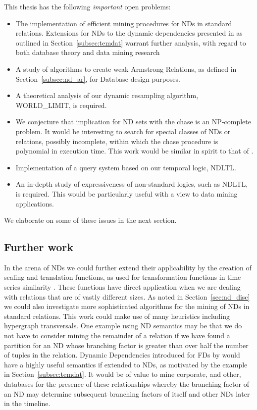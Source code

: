 This thesis has the following {\em important} open problems:
\begin{itemize}
\item The implementation of efficient mining procedures for NDs in
standard relations. Extensions for NDs to the dynamic dependencies presented
in \cite{Via87,Via88} as outlined in Section~\ref{subsec:temdat}
warrant further analysis, with regard to both database theory and data
mining research
\item A study of algorithms to create weak Armstrong Relations, as
defined in Section~\ref{subsec:nd_ar}, for
Database design purposes. 
\item A theoretical analysis of our dynamic resampling
algorithm, WORLD\_LIMIT, is required.
\item We conjecture that
implication for ND sets with the chase is an NP-complete problem. It would be
interesting to search for special classes of NDs or relations,
possibly incomplete, within
which the chase procedure is polynomial in execution time. This work
would be similar in spirit to that of \cite{ll97c}.
\item Implementation of a query system based on our temporal logic,
NDLTL.
\item An in-depth study of expressiveness of non-standard logics, such
as NDLTL, is required. This would be particularly useful with a view to
data mining applications.
\end{itemize}

We elaborate on some of these issues in the next section.

\subsection{Further work}

In the arena of NDs we could further extend their applicability by the
creation of scaling and translation functions, as used for
transformation functions in time series similarity
\cite{alss95}. These functions have direct application when we are
dealing with relations that are of vastly different sizes. As noted in
Section~\ref{sec:nd_disc} we could also investigate more sophisticated
algorithms for the mining of NDs in standard relations. This work
could make use of many heuristics including hypergraph
transversals. One example using ND semantics may be that we do not 
have to consider mining the remainder of a relation if we have found a
partition for an ND whose branching factor is greater than over half
the number of tuples in the relation. Dynamic Dependencies introduced
for FDs by \cite{Via87} would have a highly useful semantics if
extended to NDs, as motivated by the example in
Section~\ref{subsec:temdat}. It would be of value to mine corporate,
and other, databases for the presence of these relationships whereby
the branching factor of an ND may determine subsequent branching
factors of itself and other NDs later in the timeline.
	
